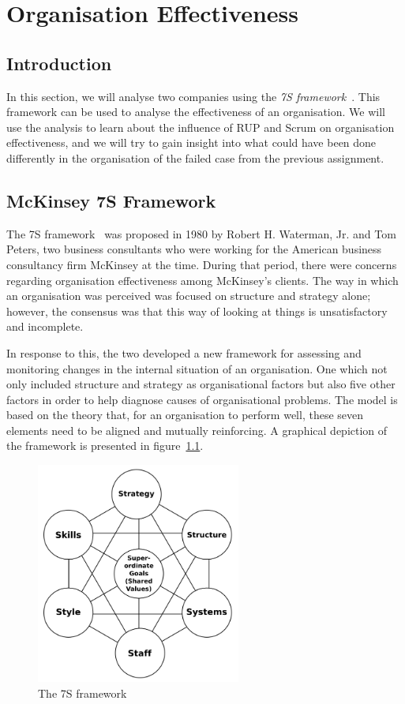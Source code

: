 \chapter{Organisation Effectiveness}

\section{Introduction}
In this section, we will analyse two companies using the \emph{7S framework}~\citep{waterman1980structure}.
This framework can be used to analyse the effectiveness of an organisation.
We will use the analysis to learn about the influence of RUP and Scrum on organisation effectiveness, and we will try to gain insight into what could have been done differently in the organisation of the failed case from the previous assignment.

\section{McKinsey 7S Framework}
The 7S framework~\citep{waterman1980structure} was proposed in 1980 by Robert H. Waterman, Jr. and Tom Peters, two business consultants who were working for the American business consultancy firm McKinsey at the time. During that period, there were concerns regarding organisation effectiveness among McKinsey's clients. The way in which an organisation was perceived was focused on structure and strategy alone; however, the consensus was that this way of looking at things is unsatisfactory and incomplete.

In response to this, the two developed a new framework for assessing and monitoring changes in the internal situation of an organisation. One which not only included structure and strategy as organisational factors but also five other factors in order to help diagnose causes of organisational problems. The model is based on the theory that, for an organisation to perform well, these seven elements need to be aligned and mutually reinforcing. A graphical depiction of the framework is presented in figure~\ref{fig:sevens_framework}.

\begin{figure}[!ht]
    \centering
        \includegraphics[width=0.6\textwidth]{graphics/sevens_framework}
    \caption{The 7S framework}
    \label{fig:sevens_framework}
\end{figure}

